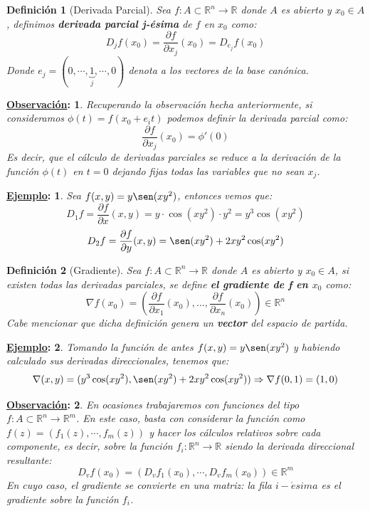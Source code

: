 \documentclass[10pt,a4paper,openright]{book}
\theoremstyle{break}
\newtheorem*{defi}{Definición}
\newtheorem*{obs}{\underline{Observación}:}
\newtheorem*{ej}{\underline{Ejemplo}:}
\begin{document}
\begin{defi}[Derivada Parcial]
Sea $f: A \subset \mathbb{R}^n \to \mathbb{R}$ donde $A$ es abierto y $x_0 \in A$, definimos \textbf{derivada parcial j-ésima} de $f$ en $x_0$ como:
$$D_j f(x_0) = \frac{\partial f}{\partial x_j} (x_0) = D_{e_j} f(x_0)$$
Donde $e_j = (0, \cdots, \underbrace{1}_{j}, \cdots, 0)$ denota a los vectores de la base canónica.
\end{defi}

\begin{obs}
Recuperando la observación hecha anteriormente, si consideramos $\phi(t) = f(x_0+e_it)$ podemos definir la derivada parcial como:
$$\frac{\partial f}{\partial x_j} (x_0) =\phi'(0)$$
Es decir, que el cálculo de derivadas parciales se reduce a la derivación de la función $\phi(t)$ en $t=0$ dejando fijas todas las variables que no sean $x_j$.
\end{obs}

\begin{ej}
Sea $f(x,y) = y\sen(xy^{2})$, entonces vemos que:
$$D_1 f = \frac{\partial f}{\partial x} (x,y)= y \cdot \cos(xy^{2})\cdot y^{2} = y^{3}\cos(xy^{2})$$
$$D_2 f = \frac{\partial f}{\partial y} (x,y)= \sen(xy^{2}) +  2xy^{2}\cos(xy^{2})$$
\end{ej}

\begin{defi}[Gradiente]
Sea $f: A \subset \mathbb{R}^n \to \mathbb{R}$ donde $A$ es abierto y $x_0 \in A$, si existen todas las derivadas parciales, se define \textbf{el gradiente de f en $x_0$} como:
$$\nabla f(x_0) = \left( \frac{\partial f}{\partial x_1} (x_0), \ldots, \frac{\partial f}{\partial x_n} (x_0) \right) \in  \mathbb{R}^n$$
Cabe mencionar que dicha definición genera un \textbf{vector} del espacio de partida.
\end{defi}

\begin{ej}
Tomando la función de antes $f(x,y) = y \sen(xy^2)$ y habiendo calculado sus derivadas direccionales, tenemos que:
$$\nabla(x,y) = (y^{3}\cos(xy^{2}), \sen(xy^{2}) +  2xy^{2}\cos(xy^{2})) \Rightarrow \nabla f(0,1) = (1,0)$$
\end{ej}

\begin{obs}
En ocasiones trabajaremos con funciones del tipo $f: A \subset \mathbb{R}^n \to \mathbb{R}^m$. En este caso, basta con considerar la función como $f(z) = (f_1(z), \cdots, f_m(z))$ y hacer los cálculos relativos sobre cada componente, es decir, sobre la función $f_i: \mathbb{R}^n \rightarrow \mathbb{R}$ siendo la derivada direccional resultante:
$$D_v f(x_0) = \left( D_v f_1(x_0), \cdots, D_v f_m(x_0)\right) \in \mathbb{R}^m$$
En cuyo caso, el gradiente se convierte en una matriz: la fila $i-\acute{e}sima$ es el gradiente sobre la función $f_i$.
\end{obs}
\end{document}
